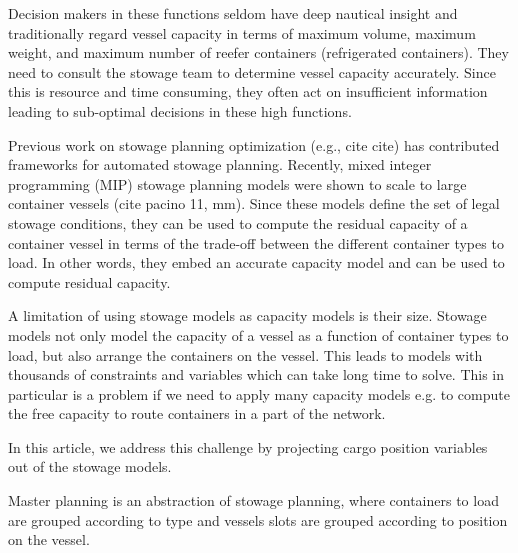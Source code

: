 Decision makers in these functions seldom have deep nautical insight and traditionally regard vessel capacity in terms of maximum volume, maximum weight, and maximum number of reefer containers (refrigerated containers). They need to consult the stowage team to determine vessel capacity accurately. Since this is resource and time consuming, they often act on insufficient information leading to sub-optimal decisions in these high functions.  

Previous work on stowage planning optimization (e.g., cite cite) has contributed frameworks for automated stowage planning. Recently, mixed integer programming (MIP) stowage planning models were shown to scale to large container vessels (cite pacino 11, mm). Since these models define the set of legal stowage conditions, they can be used to compute the residual capacity of a container vessel in terms of the trade-off between the different container types to load. In other words, they embed an accurate capacity model and can be used to compute residual capacity. 

A limitation of using stowage models as capacity models is their size. Stowage models not only model the capacity of a vessel as a function of container types to load, but also arrange the containers on the vessel. This leads to models with thousands of constraints and variables which can take long time to solve. This in particular is a problem if we need to apply many capacity models e.g. to compute the free capacity to route containers in a part of the network.

In this article, we address this challenge by projecting cargo position variables out of the stowage models.  

 Master planning is an abstraction of stowage planning, where    
containers to load are grouped according to type and vessels slots are grouped according to position on the vessel. 


%


%
